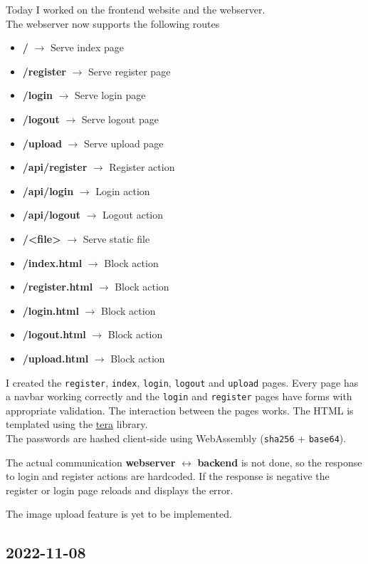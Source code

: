 \documentclass{article}
\begin{document}
Today I worked on the frontend website and the webserver. \\
The webserver now supports the following routes
\begin{itemize}
    \item \textbf{/} \(\rightarrow\) Serve index page
    \item \textbf{/register} \(\rightarrow\) Serve register page
    \item \textbf{/login} \(\rightarrow\) Serve login page
    \item \textbf{/logout} \(\rightarrow\) Serve logout page
    \item \textbf{/upload} \(\rightarrow\) Serve upload page
    \item \textbf{/api/register} \(\rightarrow\) Register action
    \item \textbf{/api/login} \(\rightarrow\) Login action
    \item \textbf{/api/logout} \(\rightarrow\) Logout action
    \item \textbf{/<file>} \(\rightarrow\) Serve static file
    \item \textbf{/index.html} \(\rightarrow\) Block action
    \item \textbf{/register.html} \(\rightarrow\) Block action
    \item \textbf{/login.html} \(\rightarrow\) Block action
    \item \textbf{/logout.html} \(\rightarrow\) Block action
    \item \textbf{/upload.html} \(\rightarrow\) Block action
\end{itemize}
I created the \texttt{register}, \texttt{index}, \texttt{login}, \texttt{logout} and \texttt{upload}
pages. Every page has a navbar working correctly and the \texttt{login} and \texttt{register}
pages have forms with appropriate validation. The interaction between the pages works.
The HTML is templated using the \href{https://github.com/Keats/tera}{tera} library. \\
The passwords are hashed client-side using WebAssembly (\texttt{sha256} + \texttt{base64}).

The actual communication \textbf{webserver} \(\longleftrightarrow\) \textbf{backend}
is not done, so the response to login and register actions are hardcoded.
If the response is negative the register or login page reloads and displays the error. 

The image upload feature is yet to be implemented.

\subsection{2022-11-08}
\end{document}
